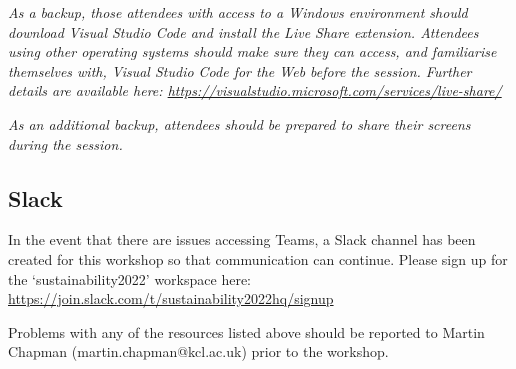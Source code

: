 \documentclass{article}
\begin{document}
\emph{As a backup, those attendees with access to a Windows environment should download \emph{Visual Studio Code} and install the \emph{Live Share} extension.
Attendees using other operating systems should make sure they can access, and familiarise themselves with, \emph{Visual Studio Code for the Web} before the session.
Further details are available here: \href{https://visualstudio.microsoft.com/services/live-share/}{https://visualstudio.microsoft.com/services/live-share/}}

\emph{As an additional backup, attendees should be prepared to share their screens during the session.}

\subsection{Slack}

In the event that there are issues accessing Teams, a Slack channel has been created for this workshop so that communication can continue.
Please sign up for the `sustainability2022' workspace here: \newline
\href{https://join.slack.com/t/sustainability2022hq/signup}{https://join.slack.com/t/sustainability2022hq/signup}

Problems with any of the resources listed above should be reported to Martin Chapman (martin.chapman@kcl.ac.uk) prior to the workshop.
\end{document}
